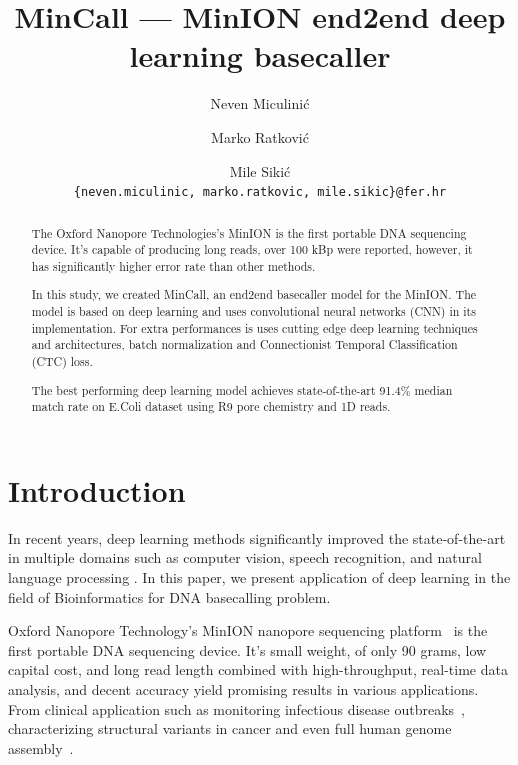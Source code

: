 \documentclass[runningheads,a4paper]{llncs}
\begin{document}
\frontmatter

\title{MinCall --- MinION end2end deep learning basecaller}
\author{Neven Miculinić \and Marko Ratković \and Mile Sikić\\
\texttt{\{neven.miculinic, marko.ratkovic, mile.sikic\}@fer.hr}}

\maketitle

\begin{abstract}
    The Oxford Nanopore Technologies's MinION is the first portable DNA sequencing device. It's capable of producing long reads, over 100 kBp were reported, however, it has significantly higher error rate than other methods.

    In this study, we created MinCall, an end2end basecaller model for the MinION. The model is based on deep learning and uses convolutional neural networks (CNN) in its implementation. For extra performances is uses cutting edge deep learning techniques and architectures, batch normalization and Connectionist Temporal Classification (CTC) loss.

    The best performing deep learning model achieves state-of-the-art  91.4\% median match rate on E.Coli dataset using R9 pore chemistry and 1D reads.
\end{abstract}

\section{Introduction}
In recent years, deep learning methods significantly improved the state-of-the-art in multiple domains such as computer vision, speech recognition, and natural language processing \cite{LeCun:1998:CNI:303568.303704}\cite{NIPS2012_4824}.
In this paper, we present application of deep learning in the field of  Bioinformatics for DNA basecalling problem.

Oxford Nanopore Technology's MinION nanopore sequencing platform~\cite{mikheyev2014first} is the first portable DNA sequencing device. It's small weight, of only 90 grams, low capital cost, and long read length combined with high-throughput, real-time data analysis, and decent accuracy yield promising results in various applications. From clinical application such as monitoring infectious disease outbreaks~\cite{judge2015early}\cite{quick2016real}, characterizing structural variants in cancer\cite{norris2016nanopore} and even full human genome assembly~\cite{jain2017nanopore}.
\end{document}
